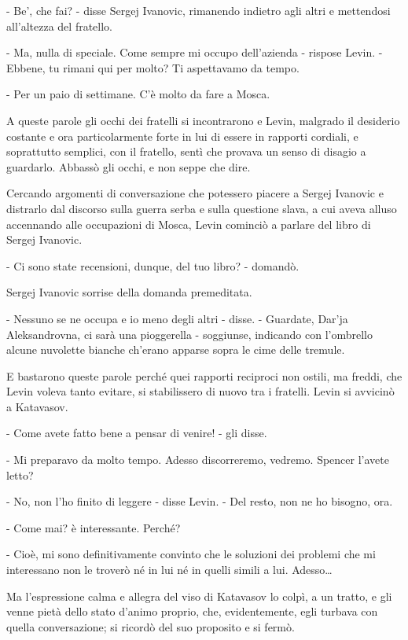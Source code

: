 - Be', che fai? - disse Sergej Ivanovic, rimanendo indietro agli altri e mettendosi all'altezza del fratello. 

- Ma, nulla di speciale. Come sempre mi occupo dell'azienda - rispose Levin. - Ebbene, tu rimani qui per molto? Ti aspettavamo da tempo. 

- Per un paio di settimane. C'è molto da fare a Mosca. 

A queste parole gli occhi dei fratelli si incontrarono e Levin, malgrado il desiderio costante e ora particolarmente forte in lui di essere in rapporti cordiali, e soprattutto semplici, con il fratello, sentì che provava un senso di disagio a guardarlo. Abbassò gli occhi, e non seppe che dire. 

Cercando argomenti di conversazione che potessero piacere a Sergej Ivanovic e distrarlo dal discorso sulla guerra serba e sulla questione slava, a cui aveva alluso accennando alle occupazioni di Mosca, Levin cominciò a parlare del libro di Sergej Ivanovic. 

- Ci sono state recensioni, dunque, del tuo libro? - domandò. 

Sergej Ivanovic sorrise della domanda premeditata. 

- Nessuno se ne occupa e io meno degli altri - disse. - Guardate, Dar'ja Aleksandrovna, ci sarà una pioggerella - soggiunse, indicando con l'ombrello alcune nuvolette bianche ch'erano apparse sopra le cime delle tremule. 

E bastarono queste parole perché quei rapporti reciproci non ostili, ma freddi, che Levin voleva tanto evitare, si stabilissero di nuovo tra i fratelli. Levin si avvicinò a Katavasov. 

- Come avete fatto bene a pensar di venire! - gli disse. 

- Mi preparavo da molto tempo. Adesso discorreremo, vedremo. Spencer l'avete letto? 

- No, non l'ho finito di leggere - disse Levin. - Del resto, non ne ho bisogno, ora. 

- Come mai? è interessante. Perché? 

- Cioè, mi sono definitivamente convinto che le soluzioni dei problemi che mi interessano non le troverò né in lui né in quelli simili a lui. Adesso\ldots{} 

Ma l'espressione calma e allegra del viso di Katavasov lo colpì, a un tratto, e gli venne pietà dello stato d'animo proprio, che, evidentemente, egli turbava con quella conversazione; si ricordò del suo proposito e si fermò. 

